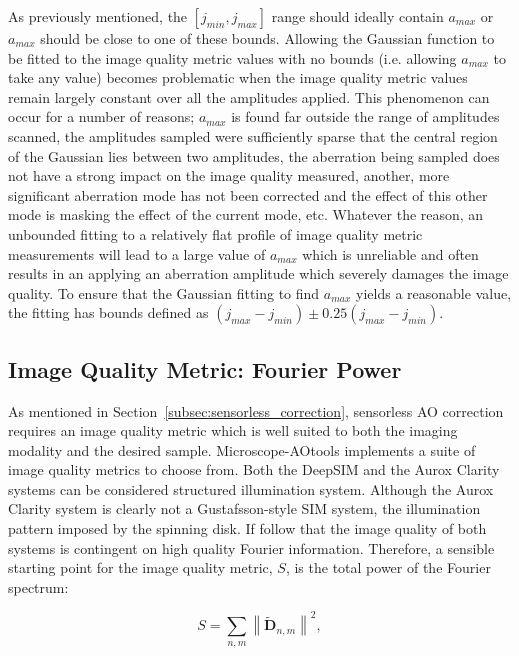 As previously mentioned, the $[j_{min},j_{max}]$ range should ideally contain $a_{max}$ or $a_{max}$ should be close to one of these bounds. Allowing the Gaussian function to be fitted to the image quality metric values with no bounds (i.e. allowing $a_{max}$ to take any value) becomes problematic when the image quality metric values remain largely constant over all the amplitudes applied. This phenomenon can occur for a number of reasons; $a_{max}$ is found far outside the range of amplitudes scanned, the amplitudes sampled were sufficiently sparse that the central region of the Gaussian lies between two amplitudes, the aberration being sampled does not have a strong impact on the image quality measured, another, more significant aberration mode has not been corrected and the effect of this other mode is masking the effect of the current mode, etc. Whatever the reason, an unbounded fitting to a relatively flat profile of image quality metric measurements will lead to a large value of $a_{max}$ which is unreliable and often results in an applying an aberration amplitude which severely damages the image quality. To ensure that the Gaussian fitting to find $a_{max}$ yields a reasonable value, the fitting has bounds defined as $(j_{max}-j_{min}) \pm 0.25(j_{max}-j_{min})$.

\subsection{Image Quality Metric: Fourier Power}
\label{subsec:fourier_power_metric}

As mentioned in Section~\ref{subsec:sensorless_correction}, 
sensorless AO correction requires an image quality metric which
is well suited to both the imaging modality and the desired 
sample. Microscope-AOtools implements a suite of image quality
metrics to choose from. Both the DeepSIM and the Aurox
Clarity systems can be considered structured illumination
system. Although the Aurox Clarity system is clearly not a 
Gustafsson-style SIM system, the illumination pattern imposed by
the spinning disk. If follow that the image quality of both systems is
contingent on high quality Fourier information. Therefore, 
a sensible starting point for the image quality metric, $S$, 
is the total power of the Fourier spectrum:

\begin{equation}\label{eq:fourier_power_spectrum}
S = \sum\limits_{n,m}{\left\| \tilde{\textbf{D}}_{n,m} \right\|^2},
\end{equation}

